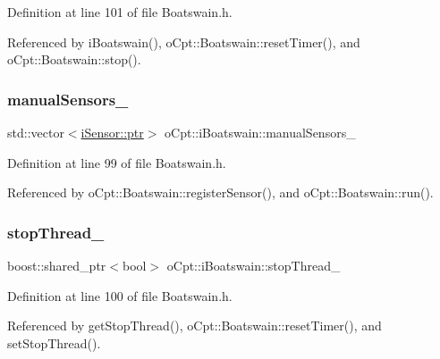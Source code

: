 Definition at line 101 of file Boatswain.\+h.



Referenced by i\+Boatswain(), o\+Cpt\+::\+Boatswain\+::reset\+Timer(), and o\+Cpt\+::\+Boatswain\+::stop().

\hypertarget{classo_cpt_1_1i_boatswain_a1b58c7613d0dae24536f2db2e0510799}{}\label{classo_cpt_1_1i_boatswain_a1b58c7613d0dae24536f2db2e0510799} 
\subsubsection{\texorpdfstring{manual\+Sensors\+\_\+}{manualSensors\_}}
{\footnotesize\ttfamily std\+::vector$<$\hyperlink{classo_cpt_1_1i_sensor_a03533d2c5dc66e332d70dbb3b5e3006a}{i\+Sensor\+::ptr}$>$ o\+Cpt\+::i\+Boatswain\+::manual\+Sensors\+\_\+\hspace{0.3cm}{\ttfamily [protected]}}



Definition at line 99 of file Boatswain.\+h.



Referenced by o\+Cpt\+::\+Boatswain\+::register\+Sensor(), and o\+Cpt\+::\+Boatswain\+::run().

\hypertarget{classo_cpt_1_1i_boatswain_a2fd1fb91df1788bb070ff4e7b7cf2c15}{}\label{classo_cpt_1_1i_boatswain_a2fd1fb91df1788bb070ff4e7b7cf2c15} 
\subsubsection{\texorpdfstring{stop\+Thread\+\_\+}{stopThread\_}}
{\footnotesize\ttfamily boost\+::shared\+\_\+ptr$<$bool$>$ o\+Cpt\+::i\+Boatswain\+::stop\+Thread\+\_\+\hspace{0.3cm}{\ttfamily [protected]}}



Definition at line 100 of file Boatswain.\+h.



Referenced by get\+Stop\+Thread(), o\+Cpt\+::\+Boatswain\+::reset\+Timer(), and set\+Stop\+Thread().

\hypertarget{classo_cpt_1_1i_boatswain_a22f6f6b95b832600c9dc1827589dca3c}{}\label{classo_cpt_1_1i_boatswain_a22f6f6b95b832600c9dc1827589dca3c} 
